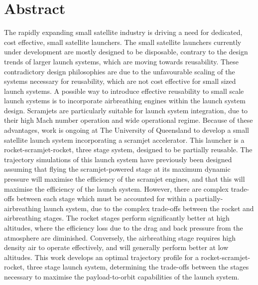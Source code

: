 \cleardoublepage

\section*{Abstract}

 The rapidly expanding small satellite industry is driving a need for dedicated, cost effective, small satellite launchers. The small satellite launchers currently under development are mostly designed to be disposable,  contrary to the design trends of larger launch systems, which are moving towards reusability. These contradictory design philosophies are due to the unfavourable scaling of the systems necessary for reusability, which are not cost effective for small sized launch systems. 
 A possible way to introduce effective reusability to small scale launch systems is to incorporate airbreathing engines within the launch system design. Scramjets are particularly suitable for launch system integration, due to their high Mach number operation and wide operational regime. 
 Because of these advantages, work is ongoing at The University of Queensland to develop a small satellite launch system incorporating a scramjet accelerator. This launcher is a rocket-scramjet-rocket, three stage system, designed to be partially reusable. 
 The trajectory simulations of this launch system have previously been designed assuming that flying the scramjet-powered stage at its maximum dynamic pressure will maximise the efficiency of the scramjet engines, and that this will maximise the efficiency of the launch system. 
 However, there are complex trade-offs between each stage which must be accounted for within a partially-airbreathing launch system, due to the complex trade-offs between the rocket and airbreathing stages. The rocket stages perform significantly better at high altitudes, where the efficiency loss due to the drag and back pressure from the atmosphere are diminished. Conversely, the airbreathing stage requires high density air to operate effectively, and will generally perform better at low altitudes. 
 This work develops an optimal trajectory profile for a rocket-scramjet-rocket, three stage launch system, determining the trade-offs between the stages necessary to maximise the payload-to-orbit capabilities of the launch system. 
 
